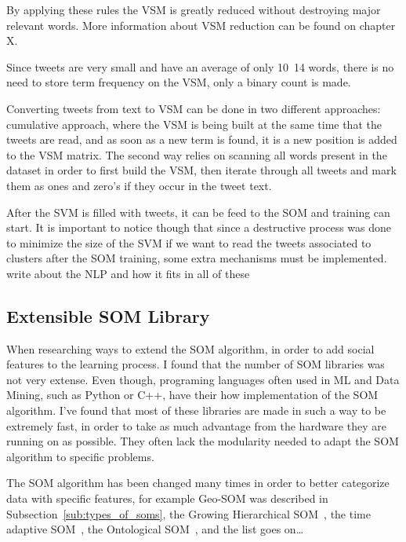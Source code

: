 By applying these rules the \ac{VSM} is greatly reduced without destroying major relevant words. More information about \ac{VSM} reduction can be found on chapter X.

Since tweets are very small and have an average of only 10~14 words, there is no need to store term frequency on the \ac{VSM}, only a binary count is made.

Converting tweets from text to \ac{VSM} can be done in two different approaches: cumulative approach, where the \ac{VSM} is being built at the same time that the tweets are read, and as soon as a new term is found, it is a new position is added to the \ac{VSM} matrix. The second way relies on scanning all words present in the dataset in order to first build the \ac{VSM}, then iterate through all tweets and mark them as ones and zero's if they occur in the tweet text. 

After the \ac{SVM} is filled with tweets, it can be feed to the \ac{SOM} and training can start. It is important to notice though that since a destructive process was done to minimize the size of the \ac{SVM} if we want to read the tweets associated to clusters after the \ac{SOM} training, some extra mechanisms must be implemented.
{\color{red} write about the NLP and how it fits in all of these }
\subsection{Extensible SOM Library}
\label{sub:extensible_som_library}

When researching ways to extend the \ac{SOM} algorithm, in order to add social features to the learning process. I found that the number of \ac{SOM} libraries was not very extense. Even though, programing languages often used in \ac{ML} and Data Mining, such as Python or C++, have their how implementation of the \ac{SOM} algorithm. I've found that most of these libraries are made in such a way to be extremely fast, in order to take as much advantage from the hardware they are running on as possible. They often lack the modularity needed to adapt the \ac{SOM} algorithm to specific problems.

The \ac{SOM} algorithm has been changed many times in order to better categorize data with specific features, for example Geo-SOM was described in Subsection~\ref{sub:types_of_soms}, the Growing Hierarchical SOM~\cite[]{1058070}, the time adaptive SOM~\cite[]{1187438}, the Ontological SOM~\cite[]{5446427}, and the list goes on\dots  

